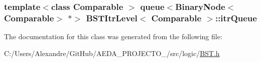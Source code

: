 \subsubsection[{itr\+Queue}]{\setlength{\rightskip}{0pt plus 5cm}template$<$class Comparable $>$ queue$<${\bf Binary\+Node}$<$Comparable$>$ $\ast$$>$ {\bf B\+S\+T\+Itr\+Level}$<$ Comparable $>$\+::itr\+Queue\hspace{0.3cm}{\ttfamily [private]}}\label{class_b_s_t_itr_level_a6de8f9f3e129e2a358b00ffa35abcb0e}


The documentation for this class was generated from the following file\+:\begin{DoxyCompactItemize}
\item 
C\+:/\+Users/\+Alexandre/\+Git\+Hub/\+A\+E\+D\+A\+\_\+\+P\+R\+O\+J\+E\+C\+T\+O\+\_/src/logic/\hyperlink{_b_s_t_8h}{B\+S\+T.\+h}\end{DoxyCompactItemize}
